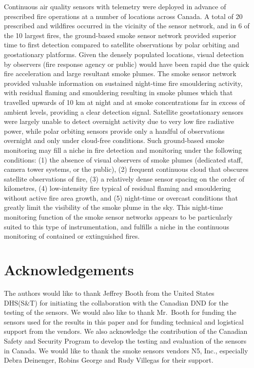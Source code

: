\documentclass[fire,article,submit,moreauthors]{mdpi}
\begin{document}
Continuous air quality sensors with telemetry were deployed in advance
of prescribed fire operations at a number of locations across Canada. A
total of 20 prescribed and wildfires occurred in the vicinity of the
sensor network, and in 6 of the 10 largest fires, the ground-based smoke
sensor network provided superior time to first detection compared to
satellite observations by polar orbiting and geostationary platforms.
Given the densely populated locations, visual detection by observers
(fire response agency or public) would have been rapid due the quick
fire acceleration and large resultant smoke plumes. The smoke sensor
network provided valuable information on sustained night-time fire
smouldering activity, with residual flaming and smouldering resulting in
smoke plumes which that travelled upwards of 10 km at night and at smoke
concentrations far in excess of ambient levels, providing a clear
detection signal. Satellite geostationary sensors were largely unable to
detect overnight activity due to very low fire radiative power, while
polar orbiting sensors provide only a handful of observations overnight
and only under cloud-free conditions. Such ground-based smoke monitoring
may fill a niche in fire detection and monitoring under the following
conditions: (1) the absence of visual observers of smoke plumes
(dedicated staff, camera tower systems, or the public), (2) frequent
continuous cloud that obscures satellite observations of fire, (3) a
relatively dense sensor spacing on the order of kilometres, (4)
low-intensity fire typical of residual flaming and smouldering without
active fire area growth, and (5) night-time or overcast conditions that
greatly limit the visibility of the smoke plume in the sky. This
night-time monitoring function of the smoke sensor networks appears to
be particularly suited to this type of instrumentation, and fulfills a
niche in the continuous monitoring of contained or extinguished fires.

\section{Acknowledgements}\label{acknowledgements}

The authors would like to thank Jeffrey Booth from the United States
DHS(S\&T) for initiating the collaboration with the Canadian DND for the
testing of the sensors. We would also like to thank Mr.~Booth for
funding the sensors used for the results in this paper and for funding
technical and logistical support from the vendors. We also acknowledge
the contribution of the Canadian Safety and Security Program to develop
the testing and evaluation of the sensors in Canada. We would like to
thank the smoke sensors vendors N5, Inc., especially Debra Deinenger,
Robins George and Rudy Villegas for their support.
\end{document}
